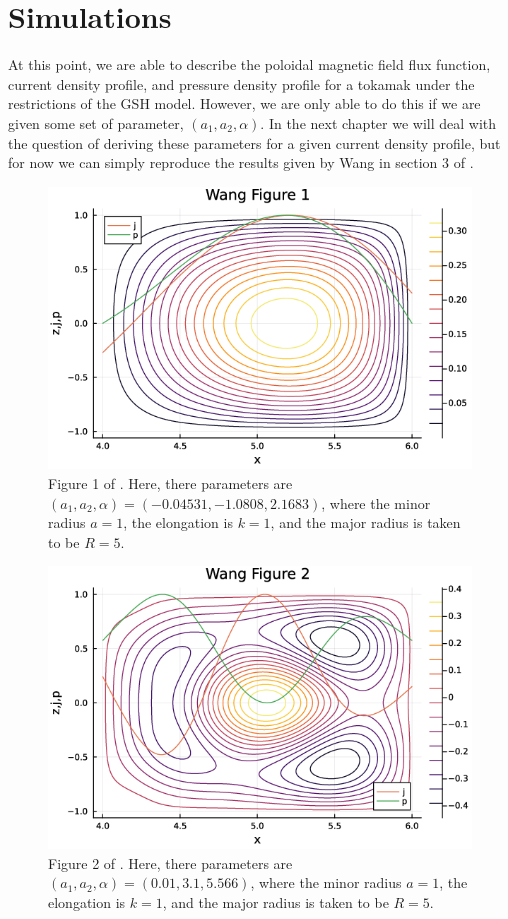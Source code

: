 \section{Simulations}
At this point, we are able to describe the poloidal magnetic field flux function, current density profile, and pressure density profile for a 
tokamak under the restrictions of the GSH model. However, we are only able to do this if we are given some set of parameter, $(a_1, a_2, \alpha)$. 
In the next chapter we will deal with the question of deriving these parameters for a given current density profile, but for now we can simply reproduce 
the results given by Wang in section 3 of \cite{wang-analytic-solution}.

\begin{figure}[h!]
    \centering
    \includegraphics[scale=0.6]{imgs/c3/wang-fig-1.png}
    \caption{Figure 1 of \cite{wang-analytic-solution}. Here, there parameters are $(a_1, a_2, \alpha) = (-0.04531, -1.0808, 2.1683)$, 
    where the minor radius $a = 1$, the elongation is $k = 1$, and the major radius is taken to be $R = 5$.}
\end{figure}

\begin{figure}[h!]
    \centering
    \includegraphics[scale=0.6]{imgs/c3/wang-fig-2.png}
    \caption{Figure 2 of \cite{wang-analytic-solution}. Here, there parameters are $(a_1, a_2, \alpha) = (0.01, 3.1, 5.566)$, 
    where the minor radius $a = 1$, the elongation is $k = 1$, and the major radius is taken to be $R = 5$.}
\end{figure}


